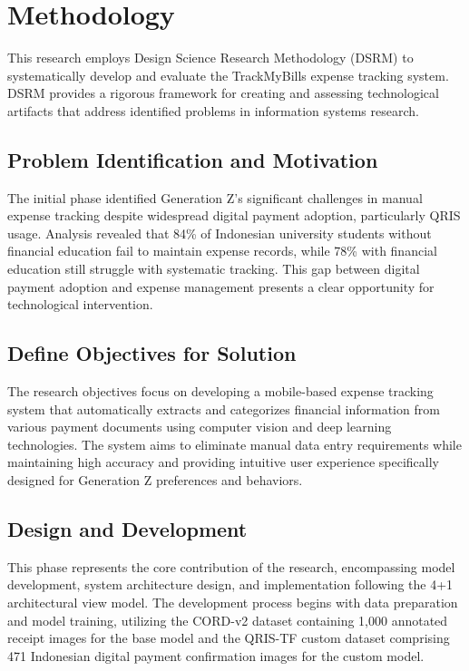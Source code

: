 \section{Methodology}

This research employs Design Science Research Methodology (DSRM) to systematically develop and evaluate the TrackMyBills expense tracking system. DSRM provides a rigorous framework for creating and assessing technological artifacts that address identified problems in information systems research.

\subsection{Problem Identification and Motivation}
The initial phase identified Generation Z's significant challenges in manual expense tracking despite widespread digital payment adoption, particularly QRIS usage. Analysis revealed that 84\% of Indonesian university students without financial education fail to maintain expense records, while 78\% with financial education still struggle with systematic tracking. This gap between digital payment adoption and expense management presents a clear opportunity for technological intervention.

\subsection{Define Objectives for Solution}
The research objectives focus on developing a mobile-based expense tracking system that automatically extracts and categorizes financial information from various payment documents using computer vision and deep learning technologies. The system aims to eliminate manual data entry requirements while maintaining high accuracy and providing intuitive user experience specifically designed for Generation Z preferences and behaviors.

\subsection{Design and Development}
This phase represents the core contribution of the research, encompassing model development, system architecture design, and implementation following the 4+1 architectural view model. The development process begins with data preparation and model training, utilizing the CORD-v2 dataset containing 1,000 annotated receipt images for the base model and the QRIS-TF custom dataset comprising 471 Indonesian digital payment confirmation images for the custom model.

